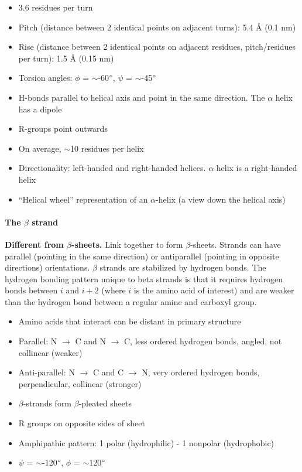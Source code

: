 \documentclass[letterpaper, 12pt]{article}
\begin{document}
\begin{itemize}
\item 3.6 residues per turn
\item Pitch (distance between 2 identical points on adjacent turns): 5.4 Å (0.1 nm)
\item Rise (distance between 2 identical points on adjacent residues, pitch/residues per turn): 1.5 Å (0.15 nm)
\item Torsion angles: $\phi$ = $\sim$-60$\degree$, $\psi$ = $\sim$-45$\degree$
\item H-bonds parallel to helical axis and point in the same direction. The $\alpha$ helix has a dipole
\item R-groups point outwards
\item On average, $\sim$10 residues per helix
\item Directionality: left-handed and right-handed helices. $\alpha$ helix is a right-handed helix
\item ``Helical wheel'' representation of an $\alpha$-helix (a view down the helical axis)
\end{itemize}

\paragraph{The $\beta$ strand} \textbf{Different from $\beta$-sheets.} Link together to form $\beta$-sheets. Strands can have parallel (pointing in the same direction) or antiparallel (pointing in opposite directions) orientations. $\beta$ strands are stabilized by hydrogen bonds. The hydrogen bonding pattern unique to beta strands is that it requires hydrogen bonds between $i$ and $i+2$ (where $i$ is the amino acid of interest) and are weaker than the hydrogen bond between a regular amine and carboxyl group.

\begin{itemize}
\item Amino acids that interact can be distant in primary structure
\item Parallel: N $\to$ C and N $\to$ C, less ordered hydrogen bonds, angled, not collinear (weaker)
\item Anti-parallel: N $\to$ C and C $\to$ N, very ordered hydrogen bonds, perpendicular, collinear (stronger)
\item $\beta$-strands form $\beta$-pleated sheets
\item R groups on opposite sides of sheet
\item Amphipathic pattern: 1 polar (hydrophilic) - 1 nonpolar (hydrophobic)
\item $\psi$ = $\sim$-120$\degree$, $\phi$ = $\sim$120$\degree$
\end{itemize}
\end{document}
